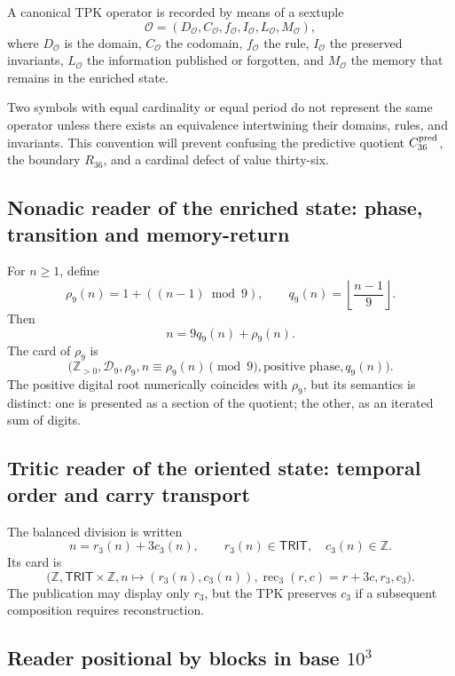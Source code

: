 \begin{definition}
\label{p12-83-c1-s13:def:tpk-ficha-operatoria}
A canonical TPK operator is recorded by means of a sextuple
\[
 \mathcal O=(D_{\mathcal O},C_{\mathcal O},f_{\mathcal O},
 I_{\mathcal O},L_{\mathcal O},M_{\mathcal O}),
\]
where \(D_{\mathcal O}\) is the domain, \(C_{\mathcal O}\) the codomain,
\(f_{\mathcal O}\) the rule, \(I_{\mathcal O}\) the preserved invariants,
\(L_{\mathcal O}\) the information published or forgotten, and
\(M_{\mathcal O}\) the memory that remains in the enriched state.
\end{definition}

Two symbols with equal cardinality or equal period do not represent the same
operator unless there exists an equivalence intertwining their domains,
rules, and invariants. This convention will prevent confusing the predictive quotient
\(C_{36}^{\rm pred}\), the boundary \(R_{36}\), and a
cardinal defect of value thirty-six.

\subsection{Nonadic reader of the enriched state: phase, transition and memory-return}

For \(n\geq1\), define
\[
 \rho_9(n)=1+((n-1)\bmod9),
 \qquad
 q_9(n)=\left\lfloor\frac{n-1}{9}\right\rfloor.
\]
Then
\[
 n=9q_9(n)+\rho_9(n).
\]
The card of \(\rho_9\) is
\[
 \bigl(
 \mathbb Z_{>0},\mathcal D_9,\rho_9,
 n\equiv\rho_9(n)\pmod9,
 \text{positive phase},
 q_9(n)
 \bigr).
\]
The positive digital root numerically coincides with \(\rho_9\), but its
semantics is distinct: one is presented as a section of the quotient; the other,
as an iterated sum of digits.

\subsection{Tritic reader of the oriented state: temporal order and carry transport}

The balanced division is written
\[
 n=r_3(n)+3c_3(n),
 \qquad r_3(n)\in\mathsf{TRIT},\quad c_3(n)\in\mathbb Z.
\]
Its card is
\[
 \bigl(
 \mathbb Z,\mathsf{TRIT}\times\mathbb Z,
 n\mapsto(r_3(n),c_3(n)),
 \operatorname{rec}_3(r,c)=r+3c,
 r_3,
 c_3
 \bigr).
\]
The publication may display only \(r_3\), but the TPK preserves
\(c_3\) if a subsequent composition requires reconstruction.

\subsection{Reader positional by blocks in base \(10^3\)}

